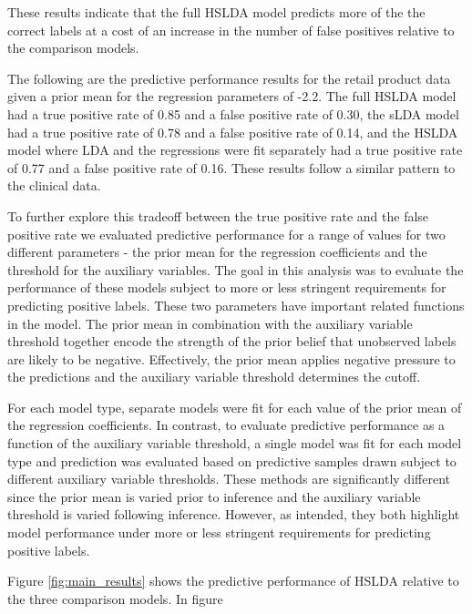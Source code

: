 These results indicate that the full HSLDA model predicts more of the the
correct labels at a cost of an increase in the number of false positives
relative to the comparison models.

The following are the predictive performance results for the retail product
data given a prior mean for the regression parameters of -2.2. 
The full HSLDA model had a true positive rate of 0.85 
and a false positive rate of 0.30, the sLDA model had a true positive
rate of 0.78 and a false positive rate of 0.14, and the HSLDA model where
LDA and the regressions were fit separately had a true positive rate of 0.77
and a false positive rate of 0.16. These results follow a similar pattern to the clinical data.

To further explore this tradeoff between the true positive rate and the
false positive rate we evaluated predictive performance for a range of values
for two different parameters - the prior mean for the regression coefficients
and the threshold for the auxiliary variables.  The goal in this analysis
was to evaluate the performance of these models subject to more or less
stringent requirements for predicting positive labels. These two parameters 
have important related functions in the model. The prior mean in combination 
with the auxiliary variable threshold together encode the strength of the prior
belief that unobserved labels are likely to be negative. Effectively, the
prior mean applies negative pressure to the predictions and the auxiliary
variable threshold determines the cutoff.

For each model type, separate models were fit for each value of the 
prior mean of the regression coefficients.  In contrast, to evaluate
predictive performance as a function of the auxiliary variable threshold,
a single model was fit for each model type and prediction was evaluated
based on predictive samples drawn subject to different auxiliary variable
thresholds. These methods are significantly different since the prior mean
is varied prior to inference and the auxiliary variable threshold is varied
following inference.  However, as intended, they both highlight model performance
under more or less stringent requirements for predicting positive labels.

Figure \ref{fig:main_results} shows the predictive performance of HSLDA 
relative to the three comparison models. In figure %

